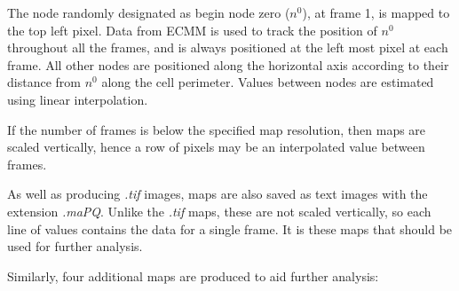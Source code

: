\documentclass[a4paper,12pt]{article}
\begin{document}
The node randomly designated as begin node zero ($n^0$), at frame 1, is mapped to the top left
pixel.  Data from ECMM is used to track the position of $n^0$
throughout all the frames, and is always positioned at the left most pixel at each frame.  All other nodes are positioned along 
the horizontal axis according to their distance from $n^0$ 
along the cell perimeter.  Values between nodes are estimated using linear interpolation. 

If the number of frames is below the specified map resolution, then maps are scaled vertically, hence 
a row of pixels may be an interpolated value between frames.  

As well as producing \textit{.tif} images, maps are also 
saved as text images with the extension \textit{.maPQ}.  Unlike the \textit{.tif} maps, these are not scaled vertically, so each line of 
values contains the data for a single frame.  It is these maps that should be used for further analysis.

Similarly, four additional maps are produced to aid further analysis:
\end{document}
